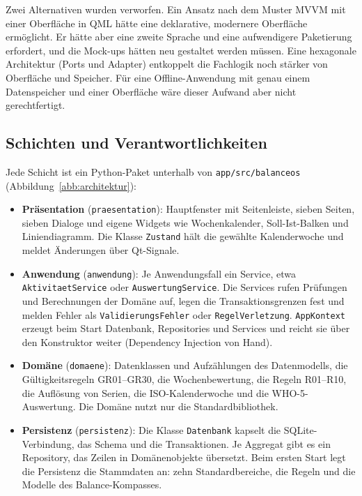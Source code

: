 Zwei Alternativen wurden verworfen. Ein Ansatz nach dem Muster \ac{MVVM} mit einer Oberfläche in \ac{QML} hätte eine deklarative, modernere Oberfläche ermöglicht. Er hätte aber eine zweite Sprache und eine aufwendigere Paketierung erfordert, und die Mock-ups hätten neu gestaltet werden müssen. Eine hexagonale Architektur (Ports und Adapter) entkoppelt die Fachlogik noch stärker von Oberfläche und Speicher. Für eine Offline-Anwendung mit genau einem Datenspeicher und einer Oberfläche wäre dieser Aufwand aber nicht gerechtfertigt.

\subsection{Schichten und Verantwortlichkeiten}
Jede Schicht ist ein Python-Paket unterhalb von \texttt{app/src/balanceos} (Abbildung~\ref{abb:architektur}):
\begin{itemize}
  \item \textbf{Präsentation} (\texttt{praesentation}): Hauptfenster mit Seitenleiste, sieben Seiten, sieben Dialoge und eigene Widgets wie Wochenkalender, Soll-Ist-Balken und Liniendiagramm. Die Klasse \texttt{Zustand} hält die gewählte Kalenderwoche und meldet Änderungen über Qt-Signale.
  \item \textbf{Anwendung} (\texttt{anwendung}): Je Anwendungsfall ein Service, etwa \texttt{AktivitaetService} oder \texttt{AuswertungService}. Die Services rufen Prüfungen und Berechnungen der Domäne auf, legen die Transaktionsgrenzen fest und melden Fehler als \texttt{ValidierungsFehler} oder \texttt{RegelVerletzung}. \texttt{AppKontext} erzeugt beim Start Datenbank, Repositories und Services und reicht sie über den Konstruktor weiter (Dependency Injection von Hand).
  \item \textbf{Domäne} (\texttt{domaene}): Datenklassen und Aufzählungen des Datenmodells, die Gültigkeitsregeln GR01--GR30, die Wochenbewertung, die Regeln R01--R10, die Auflösung von Serien, die ISO-Kalenderwoche und die WHO-5-Auswertung. Die Domäne nutzt nur die Standardbibliothek.
  \item \textbf{Persistenz} (\texttt{persistenz}): Die Klasse \texttt{Datenbank} kapselt die SQLite-Verbindung, das Schema und die Transaktionen. Je Aggregat gibt es ein Repository, das Zeilen in Domänenobjekte übersetzt. Beim ersten Start legt die Persistenz die Stammdaten an: zehn Standardbereiche, die Regeln und die Modelle des Balance-Kompasses.
\end{itemize}

